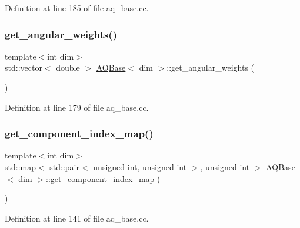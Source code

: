 Definition at line 185 of file aq\+\_\+base.\+cc.

\mbox{\label{class_a_q_base_ac3db7e901486ff088e4eac2f1401f3b6}} 
\subsubsection{\texorpdfstring{get\+\_\+angular\+\_\+weights()}{get\_angular\_weights()}}
{\footnotesize\ttfamily template$<$int dim$>$ \\
std\+::vector$<$ double $>$ \hyperlink{class_a_q_base}{A\+Q\+Base}$<$ dim $>$\+::get\+\_\+angular\+\_\+weights (\begin{DoxyParamCaption}{ }\end{DoxyParamCaption})}



Definition at line 179 of file aq\+\_\+base.\+cc.

\mbox{\label{class_a_q_base_a016f7ac88052a26c82c8aa3bfba80f73}} 
\subsubsection{\texorpdfstring{get\+\_\+component\+\_\+index\+\_\+map()}{get\_component\_index\_map()}}
{\footnotesize\ttfamily template$<$int dim$>$ \\
std\+::map$<$ std\+::pair$<$ unsigned int, unsigned int $>$, unsigned int $>$ \hyperlink{class_a_q_base}{A\+Q\+Base}$<$ dim $>$\+::get\+\_\+component\+\_\+index\+\_\+map (\begin{DoxyParamCaption}{ }\end{DoxyParamCaption})}



Definition at line 141 of file aq\+\_\+base.\+cc.

\mbox{\label{class_a_q_base_a6c6f10b941afa4019a5d919eee33ebee}} 
